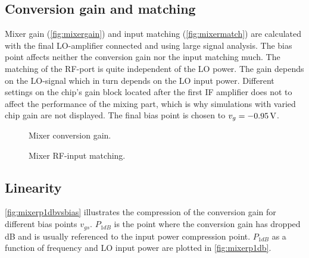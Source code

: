		\subsection{Conversion gain and matching}
			Mixer gain (\autoref{fig:mixergain}) and input matching (\autoref{fig:mixermatch}) are calculated with the final LO-amplifier connected and using large signal analysis. The bias point affects neither the conversion gain nor the input matching much. The matching of the RF-port is quite independent of the LO power. The gain depends on the LO-signal which in turn depends on the LO input power. Different settings on the chip's gain block located after the first IF amplifier does not to affect the performance of the mixing part, which is why simulations with varied chip gain are not displayed. The final bias point is chosen to $v_g=\unit[-0.95]{V}$.

			\begin{figure}[hbt!]
				\centering
				\caption[Mixer conversion gain.]{Mixer conversion gain.}\label{fig:mixergain}
			\end{figure}

			\begin{figure}[hbt!]
				\centering
				\caption[Mixer RF-input matching.]{Mixer RF-input matching.}\label{fig:mixermatch}
			\end{figure}

		\subsection{Linearity}
			\autoref{fig:mixerp1dbvsbias} illustrates the compression of the conversion gain for different bias points $v_{gs}$. $P_{1dB}$ is the point where the conversion gain has dropped \unit[1]{dB} and is usually referenced to the input power compression point. $P_{1dB}$ as a function of frequency and LO input power are plotted in \autoref{fig:mixerp1db}.

